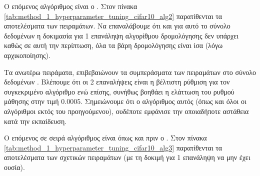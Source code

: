 Ο επόμενος αλγόριθμος είναι ο . Στον πίνακα \ref{tab:method_1_hyperparameter_tuning_cifar10_alg2} παρατίθενται τα αποτελέσματα των πειραμάτων. Να επαναλάβουμε ότι και για αυτό το σύνολο δεδομένων η δοκιμασία για 1 επανάληψη αλγορίθμου δρομολόγησης δεν υπάρχει καθώς σε αυτή την περίπτωση, όλα τα βάρη δρομολόγησης είναι ίσα (λόγω αρχικοποίησης).

\begin{table}[h]
    \begin{center}
    \end{center}
    \caption[]{\label{tab:method_1_hyperparameter_tuning_cifar10_alg2}Πειράματα στο  για την αναζήτηση υπερπαραμέτρων στον αλγόριθμο  (αλγόριθμος \ref{alg:dynam_argmax_scaled_routing}) για 30 εποχές.}
\end{table}

Τα ανωτέρω πειράματα, επιβεβαιώνουν τα συμπεράσματα των πειραμάτων στο σύνολο δεδομένων . Βλέπουμε ότι οι 2 επαναλήψεις είναι η βέλτιστη ρύθμιση για τον συγκεκριμένο αλγόριθμο ενώ επίσης, συνήθως βοηθάει η ελάττωση του ρυθμού μάθησης στην τιμή $0.0005$. Σημειώνουμε ότι ο αλγόριθμος αυτός (όπως και όλοι οι αλγόριθμοι εκτός του προηγούμενου), ουδέποτε εμφάνισε την οποιαδήποτε αστάθεια κατά την εκπαίδευση.


Ο επόμενος σε σειρά αλγόριθμος είναι όπως και πριν ο . Στον πίνακα \ref{tab:method_1_hyperparameter_tuning_cifar10_alg3} παρατίθενται τα αποτελέσματα των σχετικών πειραμάτων (με τη δοκιμή για 1 επανάληψη να μην έχει ουσία).

